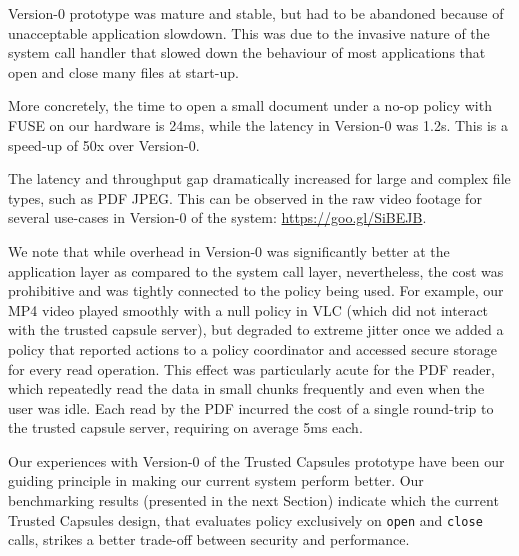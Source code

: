 Version-0 prototype was mature and stable, but had to be abandoned
because of unacceptable application slowdown. This was due to the
invasive nature of the system call handler that slowed down the
behaviour of most applications that open and close many files at
start-up. 

More concretely, the time to open a small document under a no-op
policy with FUSE on our hardware is 24ms, %
while the latency in Version-0 was 1.2s. %
This is a speed-up of 50x over Version-0.


The latency and throughput gap dramatically increased for large and
complex file types, such as PDF JPEG. This can be observed in the raw
video footage for several use-cases in Version-0 of the system:
\url{https://goo.gl/SiBEJB}.

We note that while overhead in Version-0 was significantly better at
the application layer as compared to the system call layer,
nevertheless, the cost was prohibitive and was tightly connected to
the policy being used.
%
%
For example, our MP4 video played smoothly with a null policy in VLC
(which did not interact with the trusted capsule server), but degraded
to extreme jitter once we added a policy that reported actions to a
policy coordinator and accessed secure storage for every read
operation. This effect was particularly acute for the PDF reader,
which repeatedly read the data in small chunks frequently and even
when the user was idle. Each read by the PDF incurred the cost of a
single round-trip to the trusted capsule server, requiring on average
5ms each. 

Our experiences with Version-0 of the Trusted Capsules prototype have
been our guiding principle in making our current system perform
better.
%
Our benchmarking results (presented in the next Section) indicate which
the current Trusted Capsules design, that evaluates policy exclusively
on \texttt{open} and \texttt{close} calls, strikes a better trade-off
between security and performance.


